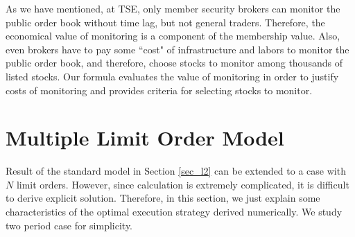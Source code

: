 As we have mentioned, at TSE, only member security brokers can monitor the public order book without time lag, but not general traders.  Therefore, the economical value of monitoring is a component of the membership value.  Also, even brokers have to pay some ``cost" of infrastructure and labors to monitor the public order book, and therefore, choose stocks to monitor among thousands of listed stocks.  Our formula evaluates the value of monitoring in order to justify costs of monitoring and provides criteria for selecting stocks to monitor.


\section{Multiple Limit Order Model}\label{sec_l4}
Result of the standard model in Section \ref{sec_l2} can be extended to a case with $N$ limit orders.  However, since calculation is extremely complicated, it is difficult to derive explicit solution.  Therefore, in this section, we just explain some characteristics of the optimal execution strategy derived numerically.  We study two period case for simplicity.

